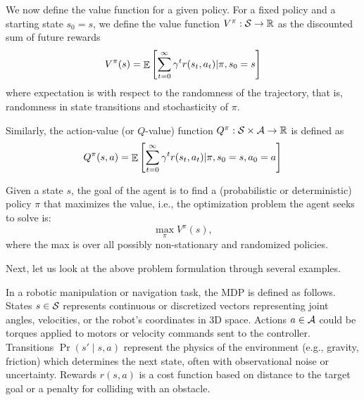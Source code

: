 We now define the value function for a given policy.
For a fixed policy and a starting state $s_0 = s$, we define the value function $V^{\pi}: \mathcal{S} \rightarrow \mathbb{R}$ as the discounted sum of future rewards
\[ V^{\pi}(s) = \mathop{\mathbb{E}}\left[ \sum_{t=0}^{\infty} \gamma^t r(s_t, a_t) | \pi, s_0 = s \right] \]
where expectation is with respect to the randomness of the trajectory, that is, randomness in state transitions and stochasticity of $\pi$.

Similarly, the action-value (or $Q$-value) function $Q^{\pi}: \mathcal{S} \times \mathcal{A} \rightarrow \mathbb{R}$ is defined as
\[ Q^{\pi}(s, a) = \mathop{\mathbb{E}}\left[ \sum_{t = 0}^{\infty} \gamma^t r(s_t, a_t) | \pi, s_0 = s, a_0 = a \right] \]

Given a state $s$, the goal of the agent is to find a (probabilistic or deterministic) policy $\pi$ that maximizes the value, i.e., the optimization problem the agent seeks to solve is:
\[ \max_{\pi} V^{\pi}(s), \]
where the max is over all possibly non-stationary and randomized policies.

Next, let us look at the above problem formulation through several examples.

\begin{example}
In a robotic manipulation or navigation task, the MDP is defined as follows.
States $s \in \mathcal{S}$ represents continuous or discretized vectors representing joint angles, velocities, or the robot's coordinates in 3D space.
Actions $a \in \mathcal{A}$ could be torques applied to motors or velocity commands sent to the controller.
Transitions $\Pr(s' \mid s, a)$ represent the physics of the environment (e.g., gravity, friction) which determines the next state, often with observational noise or uncertainty.
Rewards $r(s, a)$ is a cost function based on distance to the target goal or a penalty for colliding with an obstacle.
\end{example}


